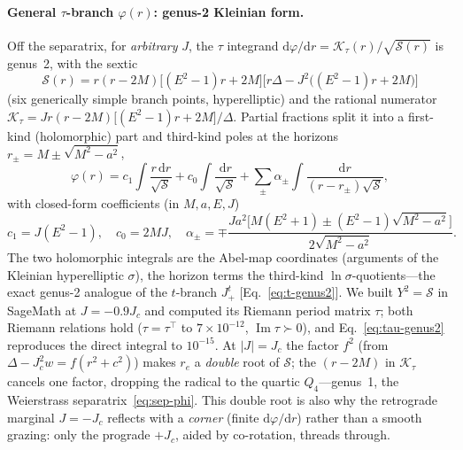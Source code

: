 \documentclass[12pt]{iopart}
\newcommand{\Jc}{J_{c}}
\newcommand{\dd}{\mathrm{d}}
\begin{document}
\paragraph{General $\tau$-branch $\varphi(r)$: genus-2 Kleinian form.} Off the
separatrix, for \emph{arbitrary} $J$, the $\tau$ integrand
$\dd\varphi/\dd r=\mathcal K_\tau(r)/\sqrt{\mathcal S(r)}$ is genus~2, with the
sextic
\begin{equation}
    \mathcal S(r)=r(r-2M)\big[(E^2-1)r+2M\big]
      \big[r\Delta-J^2\big((E^2-1)r+2M\big)\big]
    \label{eq:tau-sextic}
\end{equation}
(six generically simple branch points, hyperelliptic) and the rational numerator
$\mathcal K_\tau=Jr(r-2M)\big[(E^2-1)r+2M\big]/\Delta$. Partial fractions split it
into a first-kind (holomorphic) part and third-kind poles at the horizons
$r_\pm=M\pm\sqrt{M^2-a^2}$,
\begin{equation}
    \varphi(r)=c_1\!\int\!\frac{r\,\dd r}{\sqrt{\mathcal S}}
      +c_0\!\int\!\frac{\dd r}{\sqrt{\mathcal S}}
      +\sum_{\pm}\alpha_\pm\!\int\!\frac{\dd r}{(r-r_\pm)\sqrt{\mathcal S}},
    \label{eq:tau-genus2}
\end{equation}
with closed-form coefficients (in $M,a,E,J$)
\begin{equation}
    c_1=J(E^2-1),\quad c_0=2MJ,\quad
    \alpha_\pm=\mp\frac{Ja^2\big[M(E^2+1)\pm(E^2-1)\sqrt{M^2-a^2}\big]}
      {2\sqrt{M^2-a^2}}.
    \label{eq:tau-coeffs}
\end{equation}
The two holomorphic integrals are the Abel-map coordinates (arguments of the
Kleinian hyperelliptic $\sigma$), the horizon terms the third-kind
$\ln\sigma$-quotients---the exact genus-2 analogue of the $t$-branch $J_+^t$
[Eq.~\eqref{eq:t-genus2}]. We built $Y^2=\mathcal S$ in SageMath at $J=-0.9\Jc$
and computed its Riemann period matrix $\tau$; both Riemann relations hold
($\tau=\tau^\top$ to $7\times10^{-12}$, $\operatorname{Im}\tau\succ0$), and
Eq.~\eqref{eq:tau-genus2} reproduces the direct integral to $10^{-15}$. At
$|J|=\Jc$ the factor $f^2$ (from $\Delta-\Jc^2w=f(r^2+c^2)$) makes $r_e$ a
\emph{double} root of $\mathcal S$; the $(r-2M)$ in $\mathcal K_\tau$ cancels one
factor, dropping the radical to the quartic $Q_4$---genus~1, the Weierstrass
separatrix~\eqref{eq:sep-phi}. This double root is also why the retrograde
marginal $J=-\Jc$ reflects with a \emph{corner} (finite $\dd\varphi/\dd r$)
rather than a smooth grazing: only the prograde $+\Jc$, aided by co-rotation,
threads through.
\end{document}
